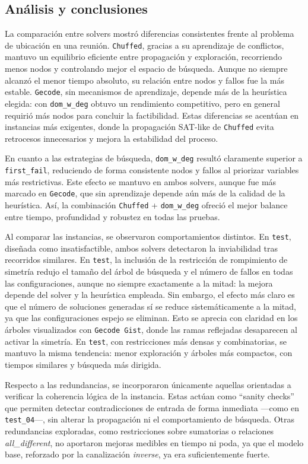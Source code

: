 
\subsection{Análisis y conclusiones}\label{sec:05-reunion-analisis-y-conclusiones}

La comparación entre solvers mostró diferencias consistentes frente al problema de ubicación en una reunión. \texttt{Chuffed}, gracias a su aprendizaje de conflictos, mantuvo un equilibrio eficiente entre propagación y exploración, recorriendo menos nodos y controlando mejor el espacio de búsqueda. Aunque no siempre alcanzó el menor tiempo absoluto, su relación entre nodos y fallos fue la más estable. \texttt{Gecode}, sin mecanismos de aprendizaje, depende más de la heurística elegida: con \texttt{dom\_w\_deg} obtuvo un rendimiento competitivo, pero en general requirió más nodos para concluir la factibilidad. Estas diferencias se acentúan en instancias más exigentes, donde la propagación SAT-like de \texttt{Chuffed} evita retrocesos innecesarios y mejora la estabilidad del proceso.

En cuanto a las estrategias de búsqueda, \texttt{dom\_w\_deg} resultó claramente superior a \texttt{first\_fail}, reduciendo de forma consistente nodos y fallos al priorizar variables más restrictivas. Este efecto se mantuvo en ambos solvers, aunque fue más marcado en \texttt{Gecode}, que sin aprendizaje depende aún más de la calidad de la heurística. Así, la combinación \texttt{Chuffed} + \texttt{dom\_w\_deg} ofreció el mejor balance entre tiempo, profundidad y robustez en todas las pruebas.

Al comparar las instancias, se observaron comportamientos distintos. En \texttt{test}, diseñada como insatisfactible, ambos solvers detectaron la inviabilidad tras recorridos similares. En \texttt{test}, la inclusión de la restricción de rompimiento de simetría redujo el tamaño del árbol de búsqueda y el número de fallos en todas las configuraciones, aunque no siempre exactamente a la mitad: la mejora depende del solver y la heurística empleada. Sin embargo, el efecto más claro es que el número de soluciones generadas sí se reduce sistemáticamente a la mitad, ya que las configuraciones espejo se eliminan. Esto se aprecia con claridad en los árboles visualizados con \texttt{Gecode Gist}, donde las ramas reflejadas desaparecen al activar la simetría. En \texttt{test}, con restricciones más densas y combinatorias, se mantuvo la misma tendencia: menor exploración y árboles más compactos, con tiempos similares y búsqueda más dirigida.

Respecto a las redundancias, se incorporaron únicamente aquellas orientadas a verificar la coherencia lógica de la instancia. Estas actúan como “sanity checks” que permiten detectar contradicciones de entrada de forma inmediata —como en \texttt{test\_04}—, sin alterar la propagación ni el comportamiento de búsqueda. Otras redundancias exploradas, como restricciones sobre sumatorias o relaciones \textit{all\_different}, no aportaron mejoras medibles en tiempo ni poda, ya que el modelo base, reforzado por la canalización \textit{inverse}, ya era suficientemente fuerte.